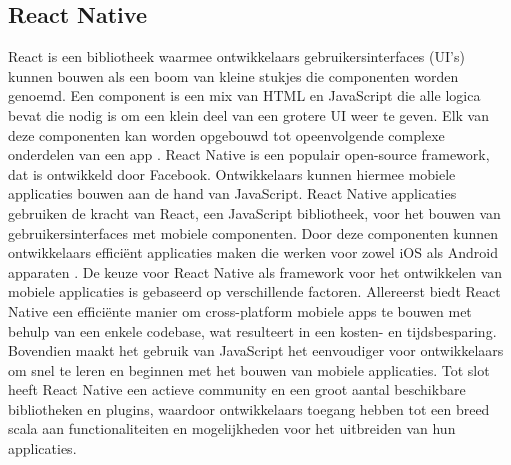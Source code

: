 \subsection{React Native}
\label{sec:react native}

React is een bibliotheek waarmee ontwikkelaars gebruikersinterfaces (UI's) kunnen bouwen als een boom van kleine stukjes die componenten worden genoemd. Een component is een mix van HTML en JavaScript die alle logica bevat die nodig is om een klein deel van een grotere UI weer te geven. Elk van deze componenten kan worden opgebouwd tot opeenvolgende complexe onderdelen van een app \autocite{Baer2018}. React Native is een populair open-source framework, dat is ontwikkeld door Facebook. Ontwikkelaars kunnen hiermee mobiele applicaties bouwen aan de hand van JavaScript. React Native applicaties gebruiken de kracht van React, een JavaScript bibliotheek, voor het bouwen van gebruikersinterfaces met mobiele componenten. Door deze componenten kunnen ontwikkelaars efficiënt applicaties maken die werken voor zowel iOS als Android apparaten \autocite{Vinnik2021}. De keuze voor React Native als framework voor het ontwikkelen van mobiele applicaties is gebaseerd op verschillende factoren. Allereerst biedt React Native een efficiënte manier om cross-platform mobiele apps te bouwen met behulp van een enkele codebase, wat resulteert in een kosten- en tijdsbesparing. Bovendien maakt het gebruik van JavaScript het eenvoudiger voor ontwikkelaars om snel te leren en beginnen met het bouwen van mobiele applicaties. Tot slot heeft React Native een actieve community en een groot aantal beschikbare bibliotheken en plugins, waardoor ontwikkelaars toegang hebben tot een breed scala aan functionaliteiten en mogelijkheden voor het uitbreiden van hun applicaties.
